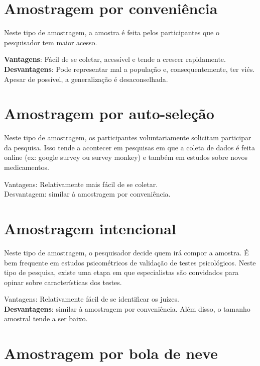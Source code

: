 \documentclass[
]{book}
\begin{document}
\hypertarget{amostragem-por-conveniuxeancia}{%
\section{Amostragem por conveniência}\label{amostragem-por-conveniuxeancia}}

Neste tipo de amostragem, a amostra é feita pelos participantes que o pesquisador tem maior acesso.

\textbf{Vantagens}: Fácil de se coletar, acessível e tende a crescer rapidamente.\\
\textbf{Desvantagens}: Pode representar mal a população e, consequentemente, ter viés. Apesar de possível, a generalização é desaconselhada.

\hypertarget{amostragem-por-auto-seleuxe7uxe3o}{%
\section{Amostragem por auto-seleção}\label{amostragem-por-auto-seleuxe7uxe3o}}

Neste tipo de amostragem, os participantes voluntariamente solicitam participar da pesquisa. Isso tende a acontecer em pesquisas em que a coleta de dados é feita online (ex: google survey ou survey monkey) e também em estudos sobre novos medicamentos.

Vantagens: Relativamente mais fácil de se coletar.\\
Desvantagem: similar à amostragem por conveniência.

\hypertarget{amostragem-intencional}{%
\section{Amostragem intencional}\label{amostragem-intencional}}

Neste tipo de amostragem, o pesquisador decide quem irá compor a amostra. É bem frequente em estudos psicométricos de validação de testes psicológicos. Neste tipo de pesquisa, existe uma etapa em que especialistas são convidados para opinar sobre características dos testes.

Vantagens: Relativamente fácil de se identificar os juízes.\\
\textbf{Desvantagens}: similar à amostragem por conveniência. Além disso, o tamanho amostral tende a ser baixo.

\hypertarget{amostragem-por-bola-de-neve}{%
\section{Amostragem por bola de neve}\label{amostragem-por-bola-de-neve}}
\end{document}
